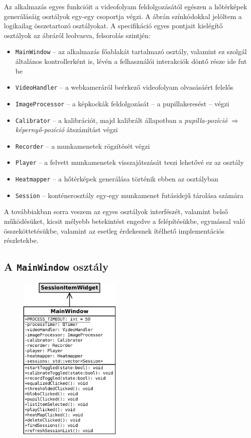 Az alkalmazás egyes funkcióit a videofolyam feldolgozásától egészen a hőtérképek generálásáig osztályok egy-egy csoportja végzi. A  ábrán színkódokkal jelöltem a logikailag összetartozó osztályokat. A specifikáció egyes pontjait kielégítő osztályok az ábráról leolvasva, felsorolás szintjén:

\begin{itemize}
  \item \texttt{MainWindow} -- az alkalmazás főablakát tartalmazó osztály, valamint ez szolgál általános kontrollerként is, lévén a felhasználói interakciók döntő része ide fut be
  \item \texttt{VideoHandler} -- a webkameráról beérkező videofolyam olvasásáért felelős
  \item \texttt{ImageProcessor} -- a képkockák feldolgozását -- a pupillakeresést -- végzi
  \item \texttt{Calibrator} -- a kalibrációt, majd kalibrált állapotban a \emph{pupilla-pozíció} $\Longrightarrow$ \emph{képernyő-pozíció} átszámítást végzi
  \item \texttt{Recorder} -- a munkamenetek rögzítését végzi
  \item \texttt{Player} -- a felvett munkamenetek visszajátszását teszi lehetővé ez az osztály
  \item \texttt{Heatmapper} -- a hőtérképek generálása történik ebben az osztályban
  \item \texttt{Session} -- konténerosztály egy-egy munkamenet futásidejű tárolása számára 
\end{itemize}

A továbbiakban sorra veszem az egyes osztályok interfészét, valamint belső működésüket, kicsit mélyebb betekintést engedve a felépítésükbe, egymással való összeköttetésükbe, valamint az esetleg érdekesnek ítélhető implementációs részletekbe.

\subsection{A \texttt{MainWindow} osztály}\label{sect:mainwindow}

\begin{figure}[!ht]
\centering
\includegraphics[width=50mm, keepaspectratio]{figures/class_mainwindow.png}
\end{figure}

